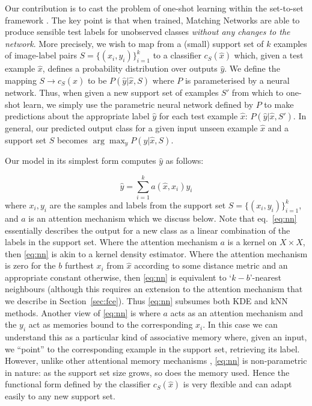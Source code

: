 Our contribution is to cast the problem of one-shot learning within the set-to-set framework \cite{vinyals2015order}.
The key point is that when trained, Matching Networks are able to produce sensible test labels for unobserved classes \emph{without any changes to the network}.
More precisely, we wish to map from a (small) support set of $k$ examples of image-label pairs $S = \{(x_i, y_i)\}_{i=1}^k$ to a classifier $c_S(\hat{x})$ which, given a test example $\hat{x}$, defines a probability distribution over outputs $\hat{y}$.
We define the mapping $S\rightarrow c_S(\hat{x})$ to be $P(\hat{y} | \hat{x}, S)$ where $P$ is parameterised by a neural network. 
Thus, when given a new support set of examples $S'$ from which to one-shot learn, we simply use the parametric neural network defined by $P$ to make predictions about the appropriate label $\hat{y}$ for each test example $\hat{x}$: $P(\hat{y}|\hat{x}, S')$.
In general, our predicted output class for a given input unseen example $\hat{x}$ and a support set $S$ becomes $\arg\max_y P(y |\hat{x}, S)$.

Our model in its simplest form computes $\hat{y}$ as follows:

\begin{equation}
\hat{y} = \sum_{i=1}^{k} a(\hat{x},x_i) y_i
\label{eq:nn}
\end{equation}
where $x_i, y_i$ are the samples and labels from the support set $S=\{(x_i,y_i)\}_{i=1}^k$, and $a$ is an attention mechanism which we discuss below.
Note that eq.~\ref{eq:nn} essentially describes the output for a new class as a linear combination of the labels in the support set.
Where the attention mechanism $a$ is a kernel on $X\times X$, then \eqref{eq:nn} is akin to a kernel density estimator.
Where the attention mechanism is zero for the $b$ furthest $x_i$ from $\hat{x}$ according to some distance metric and an appropriate constant otherwise, then
\eqref{eq:nn} is equivalent to `$k-b$'-nearest neighbours (although this requires an extension to the attention mechanism that we describe in Section~\ref{sec:fce}).
Thus \eqref{eq:nn} subsumes both KDE and kNN methods.
Another view of \eqref{eq:nn} is where $a$ acts as an attention mechanism and the $y_i$ act as memories bound to the corresponding $x_i$.
In this case we can understand this as a particular kind of associative memory where, given an input, we ``point'' to the corresponding example in the support set, retrieving its label.
However, unlike other attentional memory mechanisms \cite{montreal}, \eqref{eq:nn} is non-parametric in nature: as the support set size grows, so does
the memory used.
Hence the functional form defined by the classifier $c_S(\hat{x})$ is very flexible and can adapt easily to any new support set.

